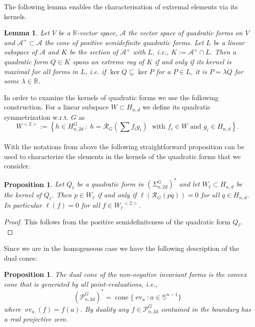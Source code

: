\documentclass[11pt,a4paper]{amsart}
\numberwithin{equation}{section}
\newtheorem{prop}[thm]{Proposition}
\newtheorem{lemma}[thm]{Lemma}
\theoremstyle{definition}
\newcommand{\R}{\mathbb{R}}
\DeclareMathOperator{\ev}{ev}
\DeclareMathOperator{\cone}{cone}
\numberwithin{thm}{section}
\theoremstyle{break}
\numberwithin{subcase}{case}
\begin{document}
The following lemma enables the characterisation of extremal elements via its kernels.
\begin{lemma} \cite[Lemma 2.2]{blekherman2012nonnegative} \label{le:MaxOfKernel}
Let $V$ be a $\R$-vector space, $\mathcal{A}$ the vector space of quadratic forms on $V$ and $\mathcal{A}^+\subset \mathcal{A}$ the cone of positive semidefinite quadratic forms. Let $L$ be a linear subspace of $\mathcal{A}$ and $K$ be the section of $\mathcal{A}^+$ with $L$, i.e., $K:=\mathcal{A}^+\cap L.$
Then a quadratic form $Q \in K$ spans an extreme ray of $K$ if and only if its kernel is maximal for all forms in $L$, i.e. if $\ker Q\subseteq \ker P$ for a $P \in L$, it is
$P=\lambda Q$ for some $\lambda\in\R$.
\end{lemma}
In order to examine the kernels of quadratic forms we use the following construction. For a linear subspace $W\subset H_{n,d}$ we define its quadratic symmetrization w.r.t. $G$ as 
$$W^{<2>}:=\left\{ h\in H_{n,2d}^G\,:\;h=\mathcal{R}_G \left(\sum f_i g_i\right)\;\text{ with } f_i \in W \text{ and  }g_i \in H_{n,d}\right\}.$$ \\
With the notations from above the following straightforward proposition can be used to characterize the elements in the kernels of the quadratic forms that we consider.

\begin{prop}\label{pro:kern}
Let $Q_\ell$ be a quadratic form in $(\Sigma_{n,2d}^{G})^*$ and let $W_\ell\subset H_{n,d}$ be the kernel of $Q_\ell$. Then
$p\in W_\ell$ if and only if $\ell\left(\mathcal{R}_G(pq)\right) = 0$ for all $q \in H_{n,d}$. In particular $\ell(f)=0$ for all $f\in {W_\ell}^{<2>}$.
\end{prop}
\begin{proof}
This follows from the positive semidefiniteness of the quadratic form $Q_\ell.$
\end{proof}

 Since we are in the homogeneous case we have the following description of the dual cones:
\begin{prop}\label{pro:DualOfNonneg} \cite{blekherman2006there}
The dual cone of the non-negative invariant forms is the convex cone that is generated by all point-evaluations, i.e., $$\left( \mathcal{P}_{n,2d}^G \right)^\ast  = \cone\{\ev_a : a \in \mathbb{S}^{n-1} \}$$   where $\ev_a (f) = f(a)$. By duality any $f \in \mathcal{P}_{n,2d}^G$ contained in the boundary has a real projective zero.
 \end{prop}
\end{document}
